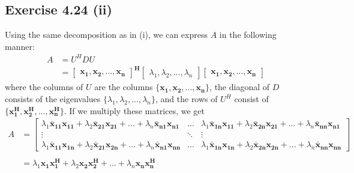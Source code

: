 \documentclass[letterpaper,12pt]{article}
\theoremstyle{definition}
\begin{document}
\subsection*{Exercise 4.24 (ii)}
Using the same decomposition as in (i), we can express $A$ in the following manner:
\begin{align*}A &= U^HDU\\
& = \begin{bmatrix}
\mathbf{x_1, x_2, ..., x_n}\end{bmatrix}^{\mathbf{H}}
\begin{bmatrix}
{\lambda_1, \lambda_2, ..., \lambda_n}
\end{bmatrix}
\begin{bmatrix}
\mathbf{x_1, x_2, ..., x_n}\end{bmatrix}
\end{align*}
where the columns of $U$ are the columns $\{\mathbf{x_1, x_2, ..., x_n}\}$, the diagonal of $D$ consists of the eigenvalues $\{\lambda_1, \lambda_2, ..., \lambda_n\}$, and the rows of $U^H$ consist of $\{\mathbf{x_1^H, x_2^H, ..., x_n^H}\}$. If we multiply these matrices, we get 
\begin{align*} A &= \begin{bmatrix}
\lambda_1\mathbf{\bar{x}_{11}x_{11}} + \lambda_2\mathbf{\bar{x}_{21}x_{21}} +...+ \lambda_n\mathbf{\bar{x}_{n1}x_{n1}} & ... & 
\lambda_1\mathbf{\bar{x}_{1n}x_{11}} + \lambda_2\mathbf{\bar{x}_{2n}x_{21}} +...+\lambda_n\mathbf{\bar{x}_{nn}x_{n1}} \\
\vdots&\ddots&\vdots\\
\lambda_1\mathbf{\bar{x}_{11}x_{1n}} + \lambda_2\mathbf{\bar{x}_{21}x_{2n}} +...+\lambda_n\mathbf{\bar{x}_{n1}x_{nn}} & ... &
\lambda_1\mathbf{\bar{x}_{1n}x_{1n}} + \lambda_2\mathbf{\bar{x}_{2n}x_{2n}} +...+ \lambda_n\mathbf{\bar{x}_{nn}x_{nn}} 
\end{bmatrix}\\
\\
&= \lambda_1 \mathbf{x_1x_1^H} + \lambda_2 \mathbf{x_2x_2^H} + ... + \lambda_n \mathbf{x_nx_n^H}
\end{align*}
\end{document}
